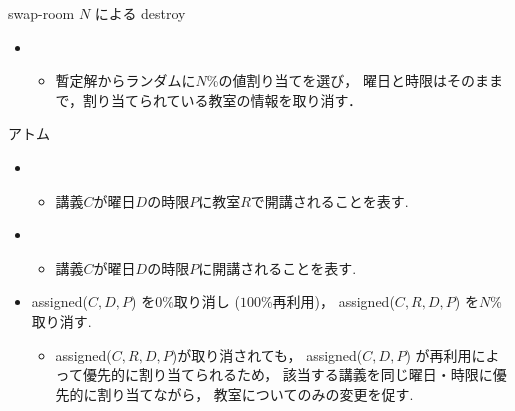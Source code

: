 \documentclass[11pt,dvipdfmx]{beamer}
\newcommand{\backupend}{
   \addtocounter{framenumberappendix}{-\value{framenumber}}
   \addtocounter{framenumber}{\value{framenumberappendix}} 
}
\begin{document}
\begin{frame}{swap-room $N$ による destroy}
 \begin{block}{}
 \begin{itemize}
  \item {}
   \begin{itemize}
    \item 暫定解からランダムに$N$\%の値割り当てを選び，
    曜日と時限はそのままで，割り当てられている教室の情報を取り消す．
   \end{itemize}
  \end{itemize}
 \end{block}
 \begin{exampleblock}{アトム}
  \begin{itemize}
   \item {}
   \begin{itemize}
    \item 講義$C$が曜日$D$の時限$P$に教室$R$で開講されることを表す.
   \end{itemize}
   \item {}
   \begin{itemize}
    \item 講義$C$が曜日$D$の時限$P$に開講されることを表す.
   \end{itemize}
  \end{itemize}
 \end{exampleblock}
 \begin{itemize}
  \item assigned($C,D,P$) を$0$\%取り消し ($100$\%再利用)，
  assigned($C,R,D,P$) を$N$\%取り消す.
  \begin{itemize}
   \item assigned($C,R,D,P$)が取り消されても，
   assigned($C,D,P$) が再利用によって優先的に割り当てられるため，
   該当する講義を同じ曜日・時限に優先的に割り当てながら，
   教室についてのみの変更を促す.
  \end{itemize}
 \end{itemize}
\end{frame}
\backupend
\end{document}
